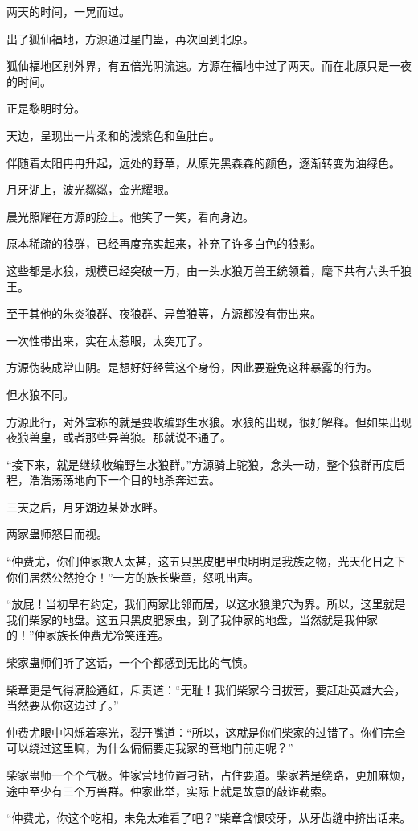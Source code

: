 \begin{this_body}
两天的时间，一晃而过。

出了狐仙福地，方源通过星门蛊，再次回到北原。

狐仙福地区别外界，有五倍光阴流速。方源在福地中过了两天。而在北原只是一夜的时间。

正是黎明时分。

天边，呈现出一片柔和的浅紫色和鱼肚白。

伴随着太阳冉冉升起，远处的野草，从原先黑森森的颜色，逐渐转变为油绿色。

月牙湖上，波光粼粼，金光耀眼。

晨光照耀在方源的脸上。他笑了一笑，看向身边。

原本稀疏的狼群，已经再度充实起来，补充了许多白色的狼影。

这些都是水狼，规模已经突破一万，由一头水狼万兽王统领着，麾下共有六头千狼王。

至于其他的朱炎狼群、夜狼群、异兽狼等，方源都没有带出来。

一次性带出来，实在太惹眼，太突兀了。

方源伪装成常山阴。是想好好经营这个身份，因此要避免这种暴露的行为。

但水狼不同。

方源此行，对外宣称的就是要收编野生水狼。水狼的出现，很好解释。但如果出现夜狼兽皇，或者那些异兽狼。那就说不通了。

“接下来，就是继续收编野生水狼群。”方源骑上驼狼，念头一动，整个狼群再度启程，浩浩荡荡地向下一个目的地杀奔过去。

三天之后，月牙湖边某处水畔。

两家蛊师怒目而视。

“仲费尤，你们仲家欺人太甚，这五只黑皮肥甲虫明明是我族之物，光天化日之下你们居然公然抢夺！”一方的族长柴章，怒吼出声。

“放屁！当初早有约定，我们两家比邻而居，以这水狼巢穴为界。所以，这里就是我们柴家的地盘。这五只黑皮肥家虫，到了我仲家的地盘，当然就是我仲家的！”仲家族长仲费尤冷笑连连。

柴家蛊师们听了这话，一个个都感到无比的气愤。

柴章更是气得满脸通红，斥责道：“无耻！我们柴家今日拔营，要赶赴英雄大会，当然要从你这边过了。”

仲费尤眼中闪烁着寒光，裂开嘴道：“所以，这就是你们柴家的过错了。你们完全可以绕过这里嘛，为什么偏偏要走我家的营地门前走呢？”

柴家蛊师一个个气极。仲家营地位置刁钻，占住要道。柴家若是绕路，更加麻烦，途中至少有三个万兽群。仲家此举，实际上就是故意的敲诈勒索。

“仲费尤，你这个吃相，未免太难看了吧？”柴章含恨咬牙，从牙齿缝中挤出话来。


\end{this_body}
